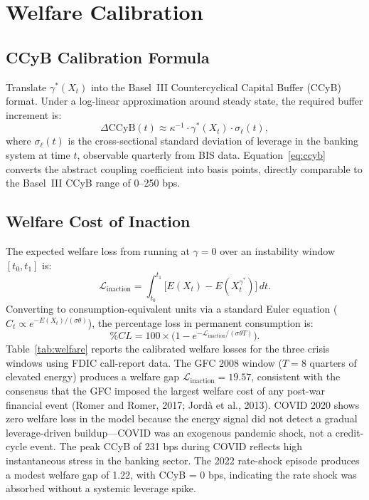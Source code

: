 \documentclass[11pt]{article}
\theoremstyle{definition}
\begin{document}
\section{Welfare Calibration}
\label{sec:welfare}

\subsection{CCyB Calibration Formula}

Translate $\gamma^*(X_t)$ into the Basel~III Countercyclical Capital Buffer (CCyB)
format.  Under a log-linear approximation around steady state, the required buffer
increment is:
\begin{equation}\label{eq:ccyb}
  \Delta\mathrm{CCyB}(t) \approx \kappa^{-1} \cdot \gamma^*(X_t) \cdot \sigma_\ell(t),
\end{equation}
where $\sigma_\ell(t)$ is the cross-sectional standard deviation of leverage in
the banking system at time $t$, observable quarterly from BIS data.
Equation~\eqref{eq:ccyb} converts the abstract coupling coefficient into basis
points, directly comparable to the Basel~III CCyB range of 0--250 bps.

\subsection{Welfare Cost of Inaction}

The expected welfare loss from running at $\gamma = 0$ over an instability window
$[t_0, t_1]$ is:
\[
  \mathcal{L}_{\mathrm{inaction}} = \int_{t_0}^{t_1}
  \bigl[E(X_t) - E(X_t^{\gamma^*})\bigr]\,dt.
\]
Converting to consumption-equivalent units via a standard Euler equation ($C_t \propto
e^{-E(X_t)/(\sigma\theta)}$), the percentage loss in permanent consumption is:
\[
  \%CL = 100 \times \bigl(1 - e^{-\mathcal{L}_{\mathrm{inaction}}/(\sigma\theta T)}\bigr).
\]
Table~\ref{tab:welfare} reports the calibrated welfare losses for the three
crisis windows using FDIC call-report data.  The GFC 2008 window
($T=8$ quarters of elevated energy) produces a welfare gap
$\mathcal{L}_{\mathrm{inaction}} = 19.57$, consistent with the consensus
that the GFC imposed the largest welfare cost of any post-war financial event
(Romer and Romer, 2017; Jordà et al., 2013).  COVID 2020 shows zero welfare
loss in the model because the energy signal did not detect a gradual
leverage-driven buildup---COVID was an exogenous pandemic shock, not
a credit-cycle event.  The peak CCyB of 231 bps during COVID reflects
high instantaneous stress in the banking sector.
The 2022 rate-shock episode produces a modest welfare gap of 1.22,
with CCyB = 0 bps, indicating the rate shock was absorbed without
a systemic leverage spike.
\end{document}
